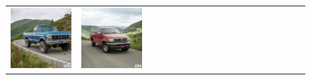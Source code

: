 \begin{figure}[ht!]
\begin{adjustwidth}{-0.8in}{-0.5in}
\begin{tabular}{cccccccccccccccccccc}
\multicolumn{2}{c}{\includegraphics[width=\threebythreecolwidth\textwidth]{figures/cherries/ford1977.jpg}} &
\multicolumn{2}{c}{\includegraphics[width=\threebythreecolwidth\textwidth]{figures/cherries/ford1997.jpg}} &

\end{tabular}
\end{adjustwidth}
\end{figure}
